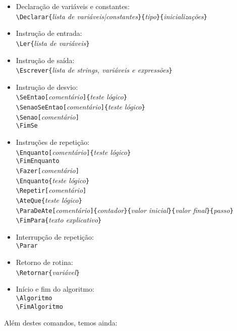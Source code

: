 \documentclass[a4paper,12pt,oneside,onecolumn]{article}
\newcommand{\comando}[1]{\texttt{\textbackslash #1}}
\newcommand{\opcoes}[1]{\texttt{[}\textsl{#1}\texttt{]}}
\newcommand{\param}[1]{\texttt{\{}\textsl{#1}\texttt{\}}}
\begin{document}
\begin{itemize}
  \item Declaração de variáveis e constantes:\\
    \comando{Declarar}\param{lista de variáveis|constantes}\param{tipo}\param{inicializações}
  \item Instrução de entrada:\\
    \comando{Ler}\param{lista de variáveis}
  \item Instrução de saída:\\
    \comando{Escrever}\param{lista de \textsl{strings}, variáveis e expressões}
  \item Instrução de desvio:\\
    \comando{SeEntao}\opcoes{comentário}\param{teste lógico}\\
    \comando{SenaoSeEntao}\opcoes{comentário}\param{teste lógico}\\
    \comando{Senao}\opcoes{comentário}\\
    \comando{FimSe}
  \item Instruções de repetição:\\
    \comando{Enquanto}\opcoes{comentário}\param{teste lógico}\\
    \comando{FimEnquanto}\\

    \comando{Fazer}\opcoes{comentário}\\
    \comando{Enquanto}\param{teste lógico}\\

    \comando{Repetir}\opcoes{comentário}\\
    \comando{AteQue}\param{teste lógico}\\

    \comando{ParaDeAte}\opcoes{comentário}\param{contador}\param{valor inicial}\param{valor final}\param{passo}\\
    \comando{FimPara}\param{texto explicativo}
  \item Interrupção de repetição:\\
    \comando{Parar}
  \item Retorno de rotina:\\
    \comando{Retornar}\param{variável}
  \item Início e fim do algoritmo:\\
    \comando{Algoritmo}\\
    \comando{FimAlgoritmo}
\end{itemize}

Além destes comandos, temos ainda:
\end{document}
